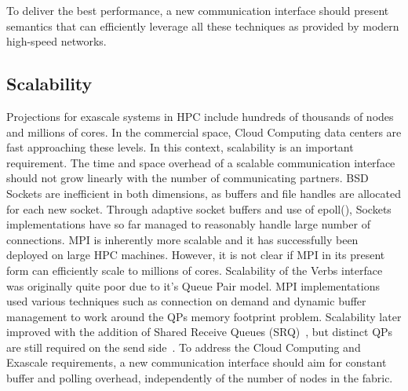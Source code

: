 To deliver the best performance, a new communication interface should present
semantics that can efficiently leverage all these techniques as provided by 
modern high-speed networks.

\subsection{Scalability}
Projections for exascale systems in HPC include hundreds of thousands of nodes 
and millions of cores\cite{dongarra:exascale-talk-2010}. In the commercial 
space, Cloud Computing data centers are fast approaching these levels. 
In this context, scalability is an important requirement. The time and space 
overhead of a scalable communication interface should not grow linearly with 
the number of communicating partners. BSD Sockets are inefficient in both 
dimensions, as buffers and file handles are allocated for each new socket. 
Through adaptive socket buffers and use of epoll(), Sockets implementations 
have so far managed to reasonably handle large number of connections. 
MPI is inherently more scalable and it has successfully been deployed on large 
HPC machines. However, it is not clear if MPI in its present form can 
efficiently scale to millions of cores. 
Scalability of the Verbs interface was originally quite poor due to it's Queue 
Pair model. MPI implementations used various techniques such as connection on 
demand\cite{Shipman_infinibandscalability} and dynamic buffer management 
to work around the QPs memory footprint problem. Scalability later
improved  with the addition of Shared Receive Queues 
(SRQ)~\cite{shipman07:_inves_infin}, but distinct QPs are still  
required on the send side~\cite{Shipman:2008:XIS:1431669.1431683}. To
address the Cloud Computing and Exascale requirements, a new
communication interface should aim for constant buffer and polling
overhead, independently of the number of nodes in the fabric. 

